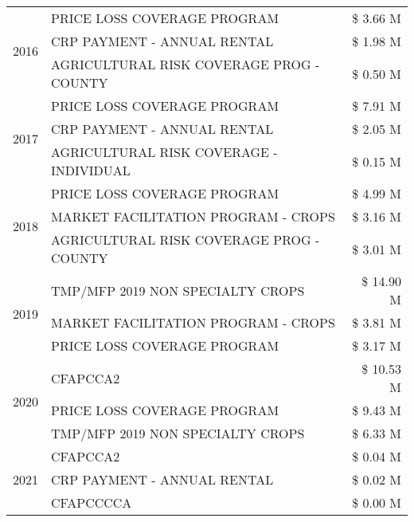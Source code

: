 \begin{tabular}{llr}
\cline{1-3}
\multirow[t]{3}{*}{2016} & PRICE LOSS COVERAGE PROGRAM & \$ 3.66 M \\
 & CRP PAYMENT - ANNUAL RENTAL & \$ 1.98 M \\
 & AGRICULTURAL RISK COVERAGE PROG - COUNTY & \$ 0.50 M \\
\cline{1-3}
\multirow[t]{3}{*}{2017} & PRICE LOSS COVERAGE PROGRAM & \$ 7.91 M \\
 & CRP PAYMENT - ANNUAL RENTAL & \$ 2.05 M \\
 & AGRICULTURAL RISK COVERAGE - INDIVIDUAL & \$ 0.15 M \\
\cline{1-3}
\multirow[t]{3}{*}{2018} & PRICE LOSS COVERAGE PROGRAM & \$ 4.99 M \\
 & MARKET FACILITATION PROGRAM - CROPS & \$ 3.16 M \\
 & AGRICULTURAL RISK COVERAGE PROG - COUNTY & \$ 3.01 M \\
\cline{1-3}
\multirow[t]{3}{*}{2019} & TMP/MFP 2019 NON SPECIALTY CROPS & \$ 14.90 M \\
 & MARKET FACILITATION PROGRAM - CROPS & \$ 3.81 M \\
 & PRICE LOSS COVERAGE PROGRAM & \$ 3.17 M \\
\cline{1-3}
\multirow[t]{3}{*}{2020} & CFAPCCA2 & \$ 10.53 M \\
 & PRICE LOSS COVERAGE PROGRAM & \$ 9.43 M \\
 & TMP/MFP 2019 NON SPECIALTY CROPS & \$ 6.33 M \\
\cline{1-3}
\multirow[t]{3}{*}{2021} & CFAPCCA2 & \$ 0.04 M \\
 & CRP PAYMENT - ANNUAL RENTAL & \$ 0.02 M \\
 & CFAPCCCCA & \$ 0.00 M \\
\cline{1-3}
\bottomrule
\end{tabular}
